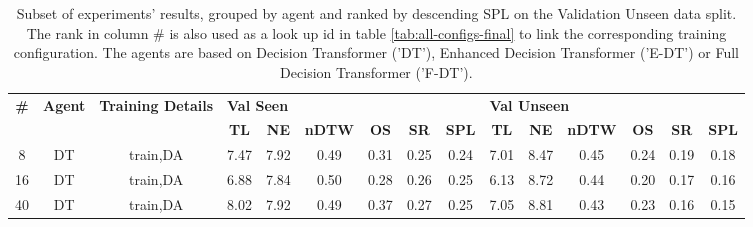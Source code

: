 \begin{table}
\centering
\caption{\label{tab:dagger_prob}Subset of experiments' results, grouped by agent and ranked by descending SPL on the Validation Unseen data split. The rank in column \# is also used as a look up id in table \ref{tab:all-configs-final} to link the corresponding training configuration.     \newline The agents are based on Decision Transformer ('DT'), Enhanced Decision Transformer ('E-DT') or Full Decision Transformer ('F-DT').}
\begin{tabular}{@{\hskip3pt}c@{\hskip3pt}c@{\hskip3pt}c@{\hskip3pt}c@{\hskip3pt}c@{\hskip3pt}c@{\hskip3pt}c@{\hskip3pt}c@{\hskip3pt}c@{\hskip3pt}c@{\hskip3pt}c@{\hskip3pt}c@{\hskip3pt}c@{\hskip3pt}c@{\hskip3pt}c}
\toprule
\textbf{\#} & \textbf{Agent} & \textbf{Training Details} & \multicolumn{6}{l}{\textbf{Val Seen}} & \multicolumn{6}{l}{\textbf{Val Unseen}} \\
 \textbf{~} &     \textbf{~} &                \textbf{~} &       \textbf{TL} & \textbf{NE} & \textbf{nDTW} & \textbf{OS} & \textbf{SR} & \textbf{SPL} &         \textbf{TL} & \textbf{NE} & \textbf{nDTW} & \textbf{OS} & \textbf{SR} & \textbf{SPL} \\
\midrule
          8 &             DT &                  train,DA &              7.47 &        7.92 &          0.49 &        0.31 &        0.25 &         0.24 &                7.01 &        8.47 &          0.45 &        0.24 &        0.19 &         0.18 \\
         16 &             DT &                  train,DA &              6.88 &        7.84 &          0.50 &        0.28 &        0.26 &         0.25 &                6.13 &        8.72 &          0.44 &        0.20 &        0.17 &         0.16 \\
         40 &             DT &                  train,DA &              8.02 &        7.92 &          0.49 &        0.37 &        0.27 &         0.25 &                7.05 &        8.81 &          0.43 &        0.23 &        0.16 &         0.15 \\
\bottomrule
\end{tabular}
\end{table}
